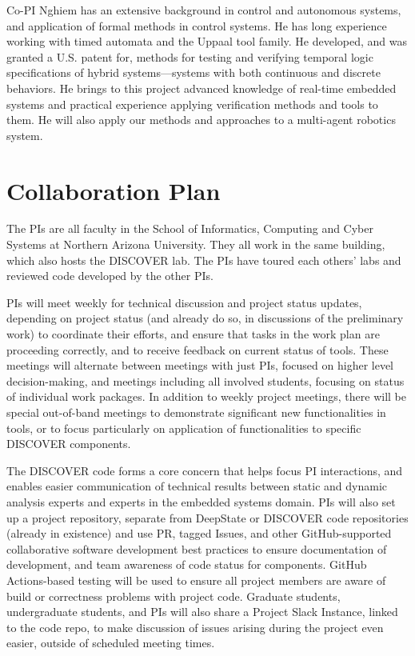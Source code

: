 \documentclass[12pt]{article}
\begin{document}
Co-PI Nghiem has an extensive background in control and autonomous systems, and application of formal methods in control systems.
He has long experience working with timed automata and the Uppaal tool family.
He developed, and was granted a U.S. patent for, methods for testing and verifying temporal logic specifications of hybrid systems---systems with both continuous and discrete behaviors.
He brings to this project advanced knowledge of real-time embedded systems and practical experience applying verification methods and tools to them.
He will also
apply our methods and approaches to a multi-agent robotics system.


\section{Collaboration Plan}

The PIs are all faculty in the School of Informatics, Computing and Cyber Systems at Northern Arizona University.  They all work in the same building, which also hosts the DISCOVER lab.  The PIs have toured each others' labs and reviewed code developed by the other PIs.


PIs will meet weekly for technical discussion and project status updates, depending on project status (and already do so, in discussions of the preliminary work) to coordinate their efforts, and ensure that tasks in the work plan are proceeding correctly, and to receive feedback on current status of tools.  These meetings will alternate between meetings with just PIs, focused on higher level decision-making, and meetings including all involved students, focusing on status of individual work packages.
In addition to weekly project meetings, there will be special out-of-band meetings to demonstrate significant new functionalities in tools, or to focus particularly on application of functionalities to specific DISCOVER components.

The DISCOVER code forms a core concern that helps focus PI interactions, and enables easier communication of technical results between static and dynamic analysis experts and experts in the embedded systems domain.  PIs will also set up a project repository, separate from DeepState or DISCOVER code repositories (already in existence) and use PR, tagged Issues, and other GitHub-supported collaborative software development best practices to ensure documentation of development, and team awareness of code status for components.  GitHub Actions-based testing will be used to ensure all project members are aware of build or correctness problems with project code.  Graduate students, undergraduate students, and PIs will also share a Project Slack Instance, linked to the code repo, to make discussion of issues arising during the project even easier, outside of scheduled meeting times.
\end{document}
